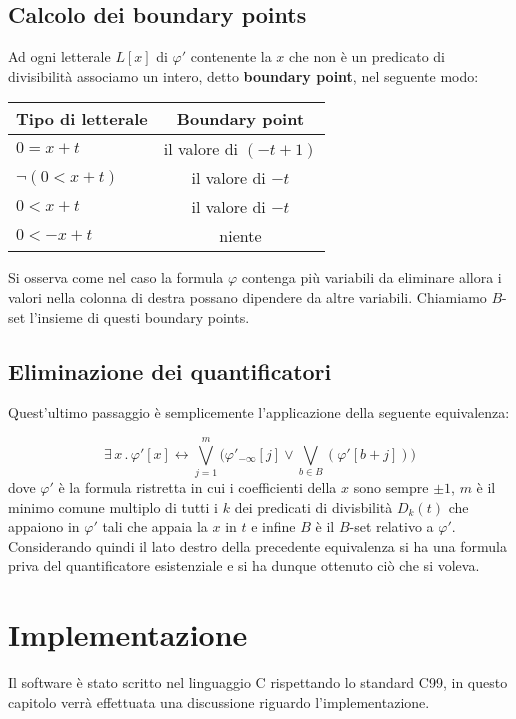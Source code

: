 \documentclass[11pt,letterpaper,twoside]{article}
\begin{document}
\subsection{Calcolo dei boundary points}
Ad ogni letterale $L[x]$ di $\varphi '$ contenente la $x$ che non \`e un
predicato di divisibilit\`a associamo un intero, detto \textbf{boundary point},
nel seguente modo:

\begin{center}
  \begin{tabular}{ l | c }
    Tipo di letterale & Boundary point \\ \hline
    $0=x+t$ & il valore di $(-t + 1)$ \\
    $\lnot (0 < x+t)$ & il valore di $-t$ \\
    $0 < x + t$ & il valore di $-t$ \\
    $0 < -x + t$ &  niente
  \end{tabular}
\end{center}
Si osserva come nel caso la formula $\varphi$ contenga pi\`u variabili da eliminare
allora i valori nella colonna di destra possano dipendere da altre variabili.
Chiamiamo $B$-set l'insieme di questi boundary points.

\subsection{Eliminazione dei quantificatori}
Quest'ultimo passaggio \`e semplicemente l'applicazione della seguente
equivalenza\autocite{cooper}:

$$ \exists \, x \, . \, \varphi'[x] \longleftrightarrow \bigvee_{j=1}^m \Big(
\varphi'_{- \infty}[j] \lor \bigvee_{b \in B}(\varphi'[b+j]) \Big)$$
dove $\varphi'$ \`e la formula ristretta in cui i coefficienti della $x$ sono
sempre $\pm 1$, $m$ \`e il minimo comune multiplo di tutti i $k$ dei predicati
di divisbilit\`a $D_k(t)$ che appaiono in $\varphi'$ tali che appaia la $x$ in
$t$ e infine $B$ \`e il $B$-set relativo a $\varphi'$.
Considerando quindi il lato destro della precedente equivalenza si ha una
formula priva del quantificatore esistenziale e si ha dunque ottenuto ci\`o che
si voleva.

\section{Implementazione}
Il software \`e stato scritto nel linguaggio C rispettando lo standard
C99\autocite{c99}, in questo capitolo verrà effettuata una discussione riguardo
l'implementazione.
\end{document}
